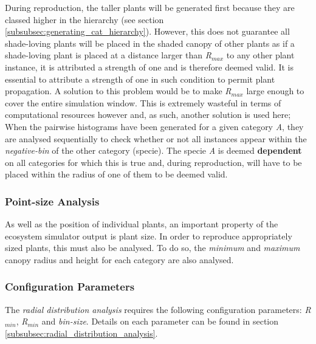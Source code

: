 During reproduction, the taller plants will be generated first because they are classed higher in the hierarchy (see section \ref{subsubsec:generating_cat_hierarchy}). However, this does not guarantee all shade-loving plants will be placed in the shaded canopy of other plants as if a shade-loving plant is placed at a distance larger than \textit{R$_{max}$} to any other plant instance, it is attributed a strength of one and is therefore deemed valid. It is essential to attribute a strength of one in such condition to permit plant propagation. A solution to this problem would be to make \textit{R$_{max}$} large enough to cover the entire simulation window. This is extremely wasteful in terms of computational resources however and, as such, another solution is used here; When the pairwise histograms have been generated for a given category \textit{A}, they are analysed sequentially to check whether or not all instances appear within the \textit{negative-bin} of the other category (specie). The specie \textit{A} is deemed \textbf{dependent} on all categories for which this is true and, during reproduction, will have to be placed within the radius of one of them to be deemed valid.

\subsubsection{Point-size Analysis}

As well as the position of individual plants, an important property of the ecosystem simulator output is plant size. In order to reproduce appropriately sized plants, this must also be analysed. To do so, the \textit{minimum} and \textit{maximum} canopy radius and height for each category are also analysed.

\subsubsection{Configuration Parameters}

The \textit{radial distribution analysis} requires the following configuration parameters: \textit{R$_{min}$}, \textit{R$_{min}$} and \textit{bin-size}. Details on each parameter can be found in section \ref{subsubsec:radial_distribution_analysis}.\\

